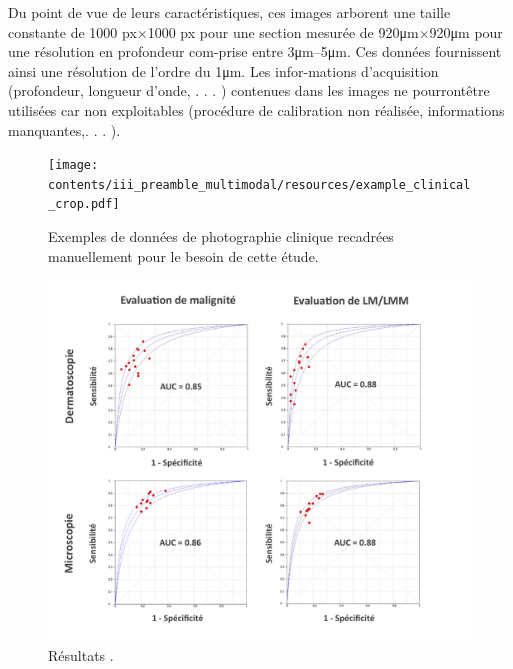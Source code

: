 Du point de vue de leurs caractéristiques, ces images arborent une taille constante de 1000 px×1000 px pour une section mesurée de 920μm×920μm pour une résolution en profondeur com-prise entre 3μm–5μm. Ces données fournissent ainsi une résolution de l’ordre du 1μm. Les infor-mations d’acquisition (profondeur, longueur d’onde, . . . )  contenues dans les images ne pourrontêtre utilisées car non exploitables (procédure de calibration non réalisée, informations manquantes,. . . ).

\begin{figure}[H]
    \begin{center}
        \texttt{[image: contents/iii\_preamble\_multimodal/resources/example\_clinical\_crop.pdf]}
        \caption{Exemples de données de photographie clinique recadrées manuellement pour le besoin de cette étude.}
        \label{fig:example_clinical_crop}
    \end{center} 
\end{figure}\par

\begin{figure}[H]
    \begin{center}
        \includegraphics[width=\linewidth]{contents/iii_preamble_multimodal/resources/results_roc_experts.pdf}
        \caption{Résultats .}
        \label{fig:results_roc_experts}
    \end{center} 
\end{figure}\par
 
